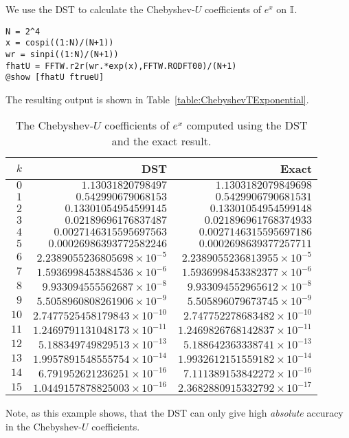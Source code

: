 \begin{example}\label{Example:DST}
We use the DST to calculate the Chebyshev-$U$ coefficients of $e^x$ on $\mathbb{I}$.
\begin{verbatim}
N = 2^4
x = cospi((1:N)/(N+1))
wr = sinpi((1:N)/(N+1))
fhatU = FFTW.r2r(wr.*exp(x),FFTW.RODFT00)/(N+1)
@show [fhatU ftrueU]
\end{verbatim}
The resulting output is shown in Table~\ref{table:ChebyshevTExponential}.
\begin{table}[htdp]
\caption{The Chebyshev-$U$ coefficients of $e^x$ computed using the DST and the exact result.}
\begin{center}
\begin{tabular}{rrr}
\hline
$k$ & DST & Exact\\
\hline
$0$ & $1.13031820798497$ & $1.1303182079849698$\\
$1$ & $0.542990679068153$ & $0.5429906790681531$\\
$2$ & $0.13301054954599145$ & $0.13301054954599148$\\
$3$ & $0.02189696176837487$ & $0.021896961768374933$\\
$4$ & $0.0027146315595697563$ & $0.0027146315595697186$\\
$5$ & $0.00026986393772582246$ & $0.0002698639377257711$\\
$6$ & $2.2389055236805698\times10^{-5}$ & $2.2389055236813955\times10^{-5}$\\
$7$ & $1.5936998453884536\times10^{-6}$ & $1.5936998453382377\times10^{-6}$\\
$8$ & $9.933094555562687\times10^{-8}$ & $9.933094552965612\times10^{-8}$\\
$9$ & $5.5058960808261906\times10^{-9}$ & $5.505896079673745\times10^{-9}$\\
$10$ & $2.7477525458179843\times10^{-10}$ & $2.747752278683482\times10^{-10}$\\
$11$ & $1.2469791131048173\times10^{-11}$ & $1.2469826768142837\times10^{-11}$\\
$12$ & $5.188349749829513\times10^{-13}$ & $5.188642363338741\times10^{-13}$\\
$13$ & $1.9957891548555754\times10^{-14}$ & $1.9932612151559182\times10^{-14}$\\
$14$ & $6.791952621236251\times10^{-16}$ & $7.111389153842272\times10^{-16}$\\
$15$ & $1.0449157878825003\times10^{-16}$ & $2.3682880915332792\times10^{-17}$\\
\hline
\end{tabular}
\end{center}
\label{table:ChebyshevUExponential}
\end{table}%
Note, as this example shows, that the DST can only give high {\em absolute} accuracy in the Chebyshev-$U$ coefficients.
\end{example}

